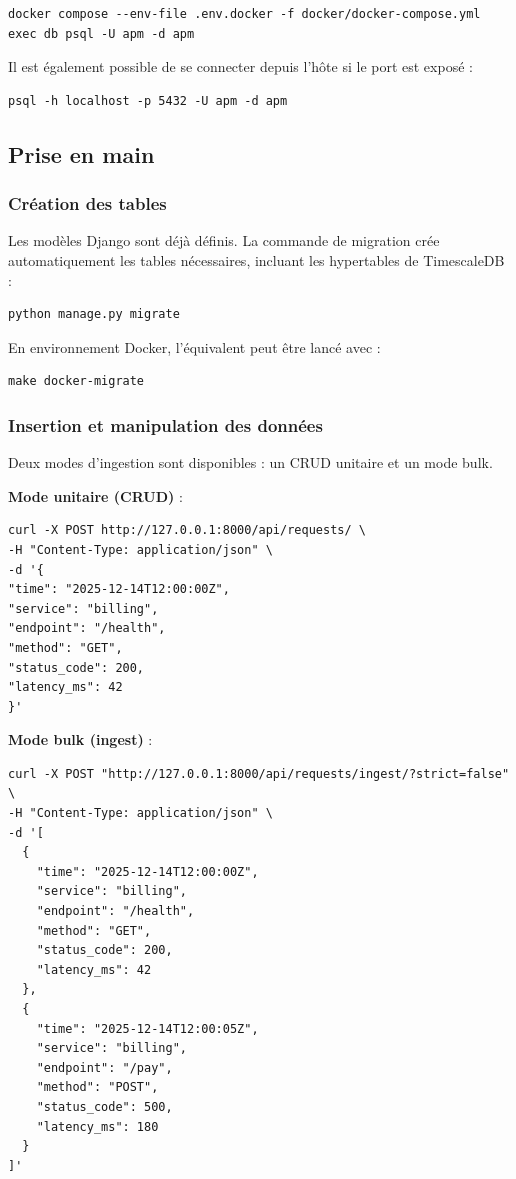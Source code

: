\begin{verbatim}
docker compose --env-file .env.docker -f docker/docker-compose.yml exec db psql -U apm -d apm
\end{verbatim}

Il est également possible de se connecter depuis l’hôte si le port est exposé :

\begin{verbatim}
psql -h localhost -p 5432 -U apm -d apm
\end{verbatim}

\subsection{Prise en main}

\subsubsection*{Création des tables}
Les modèles Django sont déjà définis. La commande de migration crée automatiquement les tables nécessaires, incluant les hypertables de TimescaleDB :

\begin{verbatim}
python manage.py migrate
\end{verbatim}

En environnement Docker, l’équivalent peut être lancé avec :

\begin{verbatim}
make docker-migrate
\end{verbatim}

\subsubsection*{Insertion et manipulation des données}
Deux modes d’ingestion sont disponibles : un CRUD unitaire et un mode bulk.

\textbf{Mode unitaire (CRUD)} :

\begin{verbatim}
curl -X POST http://127.0.0.1:8000/api/requests/ \
-H "Content-Type: application/json" \
-d '{
"time": "2025-12-14T12:00:00Z",
"service": "billing",
"endpoint": "/health",
"method": "GET",
"status_code": 200,
"latency_ms": 42
}'
\end{verbatim}

\textbf{Mode bulk (ingest)} :

\begin{verbatim}
curl -X POST "http://127.0.0.1:8000/api/requests/ingest/?strict=false" \
-H "Content-Type: application/json" \
-d '[
  {
    "time": "2025-12-14T12:00:00Z",
    "service": "billing",
    "endpoint": "/health",
    "method": "GET",
    "status_code": 200,
    "latency_ms": 42
  },
  {
    "time": "2025-12-14T12:00:05Z",
    "service": "billing",
    "endpoint": "/pay",
    "method": "POST",
    "status_code": 500,
    "latency_ms": 180
  }
]'
\end{verbatim}

